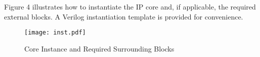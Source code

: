 Figure 4 illustrates how to instantiate the IP core and, if applicable, the
required external blocks. A Verilog instantiation template is provided for
convenience.

\begin{figure}[!htbp]
    \centerline{\texttt{[image: inst.pdf]}}
    \vspace{0cm}\caption{Core Instance and Required Surrounding Blocks}
    \label{fig:inst}
\end{figure}



